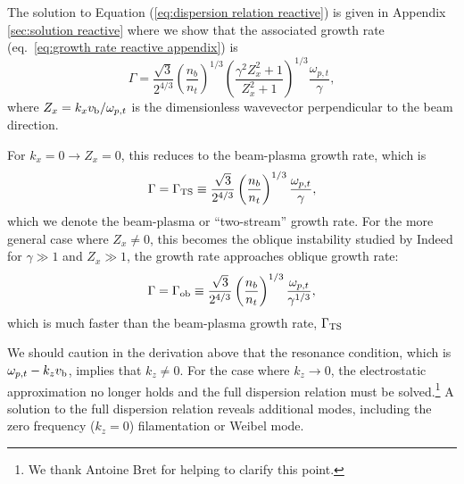 \documentclass[usenatbib,iop,apj,numberedappendix]{aeb_emulateapj_2015}
\newcommand{\vbeam}{\ensuremath{v_{\rm b}}}
\begin{document}
The solution to Equation (\ref{eq:dispersion relation reactive}) is given in Appendix \ref{sec:solution reactive} where we show that the associated growth rate (eq.~\ref{eq:growth rate reactive appendix}) is 
\begin{equation}\label{eq:growth rate reactive}
 \Gamma = \frac{\sqrt{3}}{2^{4/3}}\left(\frac{n_b}{n_t}\right)^{1/3}\left(\frac{\gamma^2 Z_x^2 + 1}{Z_x^2 + 1}\right)^{1/3}\frac{\omega_{p,t}}{\gamma},
\end{equation}
where $Z_x = k_x\vbeam/\omega_{p,t}$ is the dimensionless wavevector perpendicular to the beam direction.

For $k_x = 0 \rightarrow Z_x = 0$, this reduces to the beam-plasma growth rate, which is
\begin{equation}\label{eq:growth rate bp}
 \Gamma = \Gamma_{\rm TS} \equiv \frac{\sqrt{3}}{2^{4/3}}\left(\frac{n_b}{n_t}\right)^{1/3}\frac{\omega_{p,t}}{\gamma},
\end{equation}
which we denote the beam-plasma or ``two-stream'' growth rate.
For the more general case where $Z_x\ne 0$, this becomes the oblique instability studied by \citet{Bret-Grem-Beni:10}  Indeed for $\gamma \gg 1$ and $Z_x\gg1$, the growth rate approaches oblique growth rate:
\begin{equation}
 \Gamma = \Gamma_{\rm ob} \equiv \frac{\sqrt{3}}{2^{4/3}}\left(\frac{n_b}{n_t}\right)^{1/3}\frac{\omega_{p,t}}{\gamma^{1/3}},
\end{equation}
which is much faster than the beam-plasma growth rate, $\Gamma_{\rm TS}$

We should caution in the derivation above that the resonance condition, which is $\omega_{p,t} - k_z \vbeam$, implies that $k_z \neq 0$.  For the case where $k_z \rightarrow 0$, the electrostatic approximation no longer holds and the full dispersion relation must be solved.\footnote{We thank Antoine Bret for helping to clarify this point.}  A solution to the full dispersion relation reveals additional modes, including the zero frequency ($k_z = 0$) filamentation or Weibel mode. 
\end{document}
